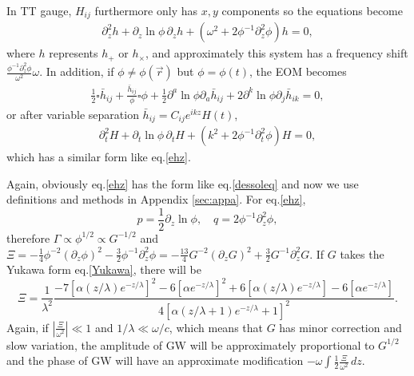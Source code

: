 \documentclass[
    jor,
    amsmath,amssymb,preprint,
    superscriptaddress,
]{revtex4-2}
\begin{document}
In TT gauge, $H_{ij}$ furthermore only has $x,y$ components so the equations become
\begin{equation}\label{ehz}
\begin{aligned}
    \partial_z^2 h+ \partial_z \ln\phi\,\partial_z h + (\omega^2 + 2\phi^{-1}\partial_z^2 \phi )h  = 0,
\end{aligned}
\end{equation}
where $h$ represents $h_+$ or $h_\times$, and approximately this system has a frequency shift $\frac{\phi^{-1}\partial_z^2\phi}{\omega^2}\omega$.
In addition, if $\phi \neq \phi(\vec{r})$ but $\phi = \phi(t)$, the EOM becomes
\begin{equation}
\begin{aligned}
\frac{1}{2}\square \bar{h}_{ij} + \frac{\bar{h}_{ij}}{\phi}\square \phi + \frac{1}{2} \partial^a \ln\phi \partial_a\bar{h}_{ij} + 2\partial^k \ln\phi\partial_j \bar{h}_{ik} = 0,
\end{aligned}
\end{equation}
or after variable separation $\bar{h}_{ij} = C_{ij}e^{ikz}H(t)$,
\begin{equation}\label{eht}
\begin{aligned}
\partial_t^2H + \partial_t\ln\phi\,\partial_tH + (k^2 + 2\phi^{-1}\partial_t^2 \phi) H = 0,
\end{aligned}
\end{equation}
which has a similar form like eq.\eqref{ehz}.

Again, obviously eq.\eqref{ehz} has the form like eq.\eqref{dessoleq} and now we use definitions and methods in Appendix \ref{sec:appa}. For eq.\eqref{ehz},
\begin{equation}
    p=\frac{1}{2}\partial_z \ln\phi,\quad q=2\phi^{-1}\partial_z^2 \phi,
\end{equation}
therefore $\Gamma\propto\phi^{1/2}\propto G^{-1/2}$ and $\Xi=-\frac{1}{4}\phi^{-2}(\partial_z\phi)^2-\frac{3}{2}\phi^{-1}\partial_z^2\phi=-\frac{13}{4}G^{-2}(\partial_zG)^2+\frac{3}{2}G^{-1}\partial_z^2G$. If $G$ takes the Yukawa form eq.\eqref{Yukawa}, there will be
\begin{equation}
    \Xi=\frac{1}{\lambda^2}\frac{-7[\alpha(z/\lambda)e^{-z/\lambda}]^2-6[\alpha e^{-z/\lambda}]^2+6[\alpha(z/\lambda)e^{-z/\lambda}]-6[\alpha e^{-z/\lambda}]}{4[\alpha(z/\lambda+1)e^{-z/\lambda}+1]^2}.
\end{equation}
Again, if $\left\lvert\frac{ \Xi}{\omega^2}\right\rvert \ll 1$ and $1/\lambda\ll\omega/c$, which means that $G$ has minor correction and slow variation, the amplitude of GW will be approximately proportional to $G^{1/2}$ and the phase of GW will have an approximate modification $-\omega\int \frac{1}{2}\frac{\Xi}{\omega^2}\,d z$.
\end{document}

